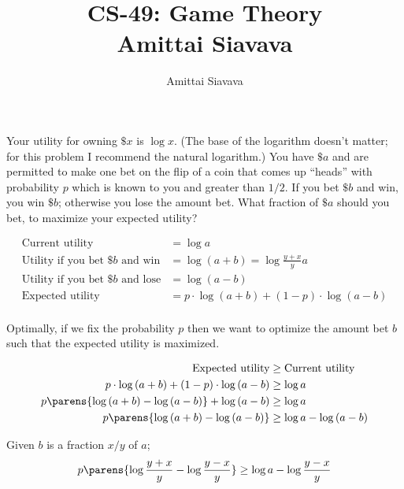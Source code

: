 \documentclass[13pt, reqno]{amsart}
\begin{document}

\title{CS-49: Game Theory\\ Amittai Siavava \\ }
\author{Amittai Siavava}


\setlength{\headheight}{13.0pt}
\setlength{\footskip}{15.0pt}

\maketitle

\begin{problem}[3]
  Your utility for owning $\$x$ is $\log{x}$.
  (The base of the logarithm doesn't matter; for this problem I recommend the natural logarithm.)
  You have $\$a$ and are permitted to make one bet on the flip of a coin that comes up ``heads''
  with probability $p$ which is known to you and greater than $1/2$.
  If you bet $\$b$ and win, you win $\$b$; otherwise you lose the amount bet.
  What fraction of $\$a$ should you bet, to maximize your expected utility?
  
  \begin{align*}
    \text{Current utility} &= \log{a} \\
    \text{Utility if you bet $\$b$ and win} &= \log{(a + b)} = \log{\frac{y + x}{y}a} \\
    \text{Utility if you bet $\$b$ and lose} &= \log{(a - b)} \\
    \text{Expected utility} &= p \cdot \log{(a + b)} + (1 - p) \cdot \log{(a - b)} \\
  \end{align*}

  Optimally, if we fix the probability $p$ then we want to optimize the amount bet $b$
  such that the expected utility is maximized.

  \begin{align*}
    \text{Expected utility} &\geq \text{Current utility} \\
    p \cdot \log{(a + b)} + (1 - p) \cdot \log{(a - b)} &\geq \log{a} \\
    p \parens{ \log{(a + b)} - \log{(a - b)}} + \log{(a - b)} &\geq \log{a} \\
    p \parens{ \log{(a + b)} - \log{(a - b)}} &\geq \log{a} - \log{(a - b)}\\
  \end{align*}

  Given $b$ is a fraction $x/y$ of $a$;
  \begin{align*}
    p \parens{\log{\frac{y + x}{y}} - \log{\frac{y-x}{y}}} &\geq \log{a} - \log{\frac{y-x}{y}}\\
  \end{align*}
\end{problem}
\end{document}
